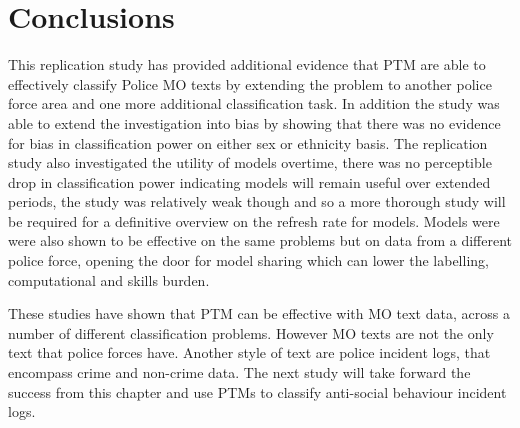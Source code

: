 \section{Conclusions}This replication study has provided additional evidence that PTM are able to effectively classify Police MO texts by extending the problem to another police force area and one more additional classification task. In addition the study was able to extend the investigation into bias by showing that there was no evidence for bias in classification power on either sex or ethnicity basis. The replication study also investigated the utility of models overtime, there was no perceptible drop in classification power indicating models will remain useful over extended periods, the study was relatively weak though and so a more thorough study will be required for a definitive overview on the refresh rate for models. Models were were also shown to be effective on the same problems but on data from a different police force, opening the door for model sharing which can lower the labelling, computational and skills burden. 

These studies have shown that PTM can be effective with MO text data, across a number of different classification problems. However MO texts are not the only text that police forces have. Another style of text are police incident logs, that encompass crime and non-crime data. The next study will take forward the success from this chapter and use PTMs to classify anti-social behaviour incident logs.






